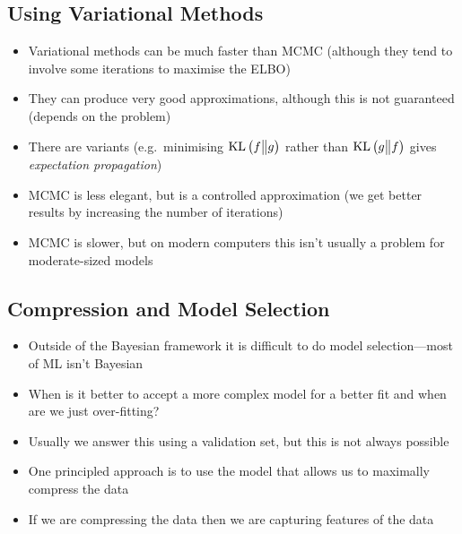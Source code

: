 \begin{slide}
\section[-2]{Using Variational Methods}

\begin{PauseHighLight}
  \begin{itemize}
  \item Variational methods can be much faster than MCMC (although
    they tend to involve some iterations to maximise the ELBO)\pause
  \item They can produce very good approximations, although this is not
    guaranteed (depends on the problem)\pause
  \item There are variants (e.g.\ minimising $\mathop{\mathrm{KL}}\left(f \big\| g\right)$ rather than
    $\mathop{\mathrm{KL}}\left(g \big\| f\right)$ gives \textit{expectation propagation})\pause
  \item MCMC is less elegant, but is a controlled approximation (we get
    better results by increasing the number of iterations)\pause
  \item MCMC is slower, but on modern computers this isn't usually a
    problem for moderate-sized models\pause
  \end{itemize}
\end{PauseHighLight}

\end{slide}




\Outline %

\begin{slide}
\section[-1]{Compression and Model Selection}
  
\begin{PauseHighLight}
  \begin{itemize}
  \item Outside of the Bayesian framework it is difficult to do model
    selection\pause---most of ML isn't Bayesian\pauseb
  \item When is it better to accept a more complex model for a better
    fit and when are we just over-fitting?\pause
  \item Usually we answer this using a validation set, but this is not
    always possible\pause
  \item One principled approach is to use the model that allows us to
    maximally compress the data\pause
  \item If we are compressing the data then we are capturing features
    of the data\pause
  \end{itemize}
\end{PauseHighLight}

\end{slide}

